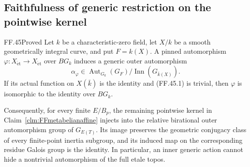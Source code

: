\subsection{Faithfulness of generic restriction on the pointwise kernel}

\begin{claim}{FF.45}{Proved}\label{clm:FFgenerickernel}
Let \(k\) be a characteristic-zero field, let \(X/k\)
be a smooth geometrically integral curve, and put
\(F=k(X)\). A pinned automorphism
\(\varphi:X_{\mathrm{\acute et}}\to
X_{\mathrm{\acute et}}\) over \(BG_k\) induces a generic
outer automorphism
\[
 \alpha_\varphi\in
 \operatorname{Aut}_{G_k}(G_F)/
              \operatorname{Inn}(G_{\bar k(X)}).
                                                        \tag{FF.45.1}
\]
If its actual function on \(X(\bar k)\) is the identity
and (FF.45.1) is trivial, then \(\varphi\) is isomorphic
to the identity over \(BG_k\).

Consequently, for every finite \(E/B_p\), the remaining
pointwise kernel in Claim~\ref{clm:FFmetabelianaffine}
injects into the relative birational outer automorphism
group of \(G_{E(T)}\). Its image preserves the geometric
conjugacy class of every finite-point inertia subgroup,
and its induced map on the corresponding residue Galois
group is the identity. In particular, an inner generic
action cannot hide a nontrivial automorphism of the full
etale topos.
\end{claim}

